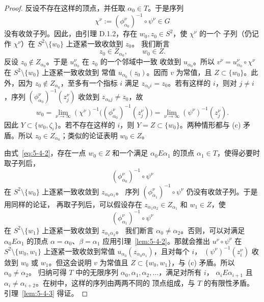 \begin{proof}
反设不存在这样的顶点，并任取 $\alpha_0\in T$。于是序列
\[
  \chi^\nu:=(\phi_{\alpha_0}^\nu)^{-1}\circ\psi^\nu\in G
\]
没有收敛子列。因此，由引理 D.1.2，存在 $w_0,z_0\in S^2$，使 $\chi^\nu$ 的一个
子列（仍记作 $\chi^\nu$）在 $S^2\setminus\{w_0\}$ 上逐紧一致收敛到 $z_0$。
我们断言
\begin{equation}\label{eq:5-4-2}
  z_0\in Z_{\alpha_0},
  \qquad w_0\in Z.
\end{equation}
反设 $z_0\notin Z_{\alpha_0}$。于是 $u_{\alpha_0}^\nu$ 在 $z_0$ 的一个邻域中一致
收敛到 $u_{\alpha_0}$。所以
$v^\nu=u_{\alpha_0}^\nu\circ\chi^\nu$ 在 $S^2\setminus\{w_0\}$ 上逐紧一致收敛到
常值 $u_{\alpha_0}(z_0)$。因而 $v$ 为常值，且 $Z\subset\{w_0\}$。此外，因为
$z_0\notin Z_{\alpha_0}$，至多有一个指标 $i$ 满足 $z_{\alpha_0i}=z_0$。若有这样的
$i$，则对 $j\ne i$，序列
$(\phi_{\alpha_0}^\nu)^{-1}(z_j^\nu)$ 收敛到
$z_{\alpha_0j}\ne z_0$，故
\[
  w_0
  =\lim_{\nu\to\infty}(\chi^\nu)^{-1}
     \bigl((\phi_{\alpha_0}^\nu)^{-1}(z_j^\nu)\bigr)
  =\lim_{\nu\to\infty}(\psi^\nu)^{-1}(z_j^\nu).
\]
因此 $Y\subset\{w_0,\zeta_i\}$。若不存在这样的 $i$，则
$Y=Z\subset\{w_0\}$。两种情形都与 (c) 矛盾。所以
$z_0\in Z_{\alpha_0}$；类似的论证表明 $w_0\in Z$。

由式~\eqref{eq:5-4-2}，存在一点 $w_0\in Z$ 和一个满足
$\alpha_0E\alpha_1$ 的顶点 $\alpha_1\in T$，使得必要时取子列后，
\[
  (\phi_{\alpha_0}^\nu)^{-1}\circ\psi^\nu
\]
在 $S^2\setminus\{w_0\}$ 上逐紧一致收敛到 $z_{\alpha_0\alpha_1}$。
序列 $(\phi_{\alpha_1}^\nu)^{-1}\circ\psi^\nu$ 仍没有收敛子列。于是用同样的论证，
再取子列后，可以假设存在
$z_{\alpha_1\alpha_2}\in Z_{\alpha_1}$ 和 $w_1\in Z$，使
\[
  (\phi_{\alpha_1}^\nu)^{-1}\circ\psi^\nu
\]
在 $S^2\setminus\{w_1\}$ 上逐紧一致收敛到 $z_{\alpha_1\alpha_2}$。
我们断言 $\alpha_0\ne\alpha_2$。否则，可以对满足 $\alpha_0E\alpha_1$ 的顶点
$\alpha=\alpha_0$、$\beta=\alpha_1$ 应用引理~\ref{lem:5-4-2}。那就会推出
$u^\nu\circ\psi^\nu$ 在 $S^2\setminus\{w_0,w_1\}$ 上逐紧一致收敛到常值
$u_{\alpha_0}(z_{\alpha_0\alpha_1})$，且对每个 $i$，
$(\psi^\nu)^{-1}(z_i^\nu)$ 收敛到 $w_0$ 或 $w_1$。但这会说明 $v$ 为常值且
$Z\subset\{w_0,w_1\}$，与 (c) 矛盾。所以 $\alpha_0\ne\alpha_2$。
归纳可得 $T$ 中的无限序列 $\alpha_0,\alpha_1,\alpha_2,\ldots$，满足对所有 $i$，
$\alpha_iE\alpha_{i+1}$ 且 $\alpha_i\ne\alpha_{i+2}$。在树中，这样的序列由两两不同的
顶点组成，与 $T$ 的有限性矛盾。引理~\ref{lem:5-4-3} 得证。
\end{proof}

